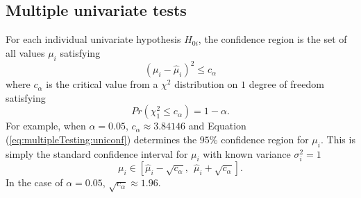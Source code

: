 \documentclass[letterpaper,12pt,oneside,final]{article}
\begin{document}
\subsection{Multiple univariate tests}
For each individual univariate hypothesis $H_{0i}$, the confidence region is the set of all values $\mu_i$ satisfying
\begin{equation}
(\mu_i - \widehat{\mu}_i)^2  \le c_\alpha
\label{eq:multipleTesting:uniconf}
\end{equation}
where $c_\alpha$ is the critical value from a $\chi^2$ distribution on $1$ degree of freedom satisfying
\[ Pr(\chi_1^2 \le c_\alpha) = 1 - \alpha. \]
For example, when $\alpha = 0.05$,  $c_\alpha \approx 3.84146$ and Equation (\ref{eq:multipleTesting:uniconf}) determines the $95\%$ confidence region for $\mu_i$.  This is simply the standard confidence interval for $\mu_i$ with known variance $\sigma_i^2 =1$
\begin{equation}
\mu_i \in [\widehat{\mu}_i - \sqrt{c_\alpha},  ~~\widehat{\mu}_i + \sqrt{c_\alpha}].
\end{equation}
In the case of $\alpha = 0.05$, $\sqrt{c_\alpha} \approx 1.96$.
\end{document}
